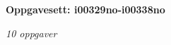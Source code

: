 \centerline{\bf Oppgavesett: i00329no-i00338no}
\vskip 10pt
\centerline{\it 10 oppgaver}\vskip 10pt
\vskip 10pt
